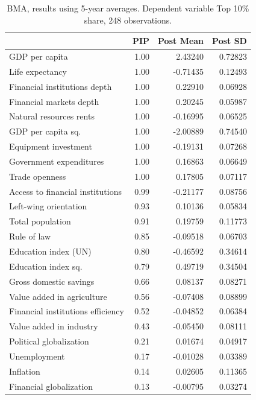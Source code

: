 \begin{refsection}
\begin{subappendices}
\begin{table}[ht!]
    \centering
    \small
    \caption{BMA, results using 5-year averages. Dependent variable Top 10\% share, 248 observations.}\label{ch4res:5y_top10}
    \begin{tabular}{lrrr}
      \toprule
     & PIP & Post Mean & Post SD \\
      \midrule
      GDP per capita & 1.00 & 2.43240 & 0.72823 \\ 
      Life expectancy & 1.00 & -0.71435 & 0.12493 \\
      Financial institutions depth & 1.00 & 0.22910 & 0.06928 \\
      Financial markets depth & 1.00 & 0.20245 & 0.05987 \\ 
      Natural resources rents & 1.00 & -0.16995 & 0.06525 \\ 
      GDP per capita sq. & 1.00 & -2.00889 & 0.74540 \\ 
      Equipment investment & 1.00 & -0.19131 & 0.07268 \\ 
      Government expenditures & 1.00 & 0.16863 & 0.06649 \\
      Trade openness & 1.00 & 0.17805 & 0.07117 \\ 
      Access to financial institutions & 0.99 & -0.21177 & 0.08756 \\ 
      Left-wing orientation & 0.93 & 0.10136 & 0.05834 \\ 
      Total population & 0.91 & 0.19759 & 0.11773 \\ 
      Rule of law & 0.85 & -0.09518 & 0.06703 \\ 
      Education index (UN) & 0.80 & -0.46592 & 0.34614 \\
      Education index sq. & 0.79 & 0.49719 & 0.34504 \\ 
      Gross domestic savings & 0.66 & 0.08137 & 0.08271 \\ 
      Value added in agriculture & 0.56 & -0.07408 & 0.08899 \\ 
      Financial institutions efficiency & 0.52 & -0.04852 & 0.06384 \\
      Value added in industry & 0.43 & -0.05450 & 0.08111 \\ 
      Political globalization & 0.21 & 0.01674 & 0.04917 \\ 
      Unemployment & 0.17 & -0.01028 & 0.03389 \\ 
      Inflation & 0.14 & 0.02605 & 0.11365 \\
      Financial globalization & 0.13 & -0.00795 & 0.03274 \\ 

\end{tabular}
\end{table}
\end{subappendices}
\end{refsection}
